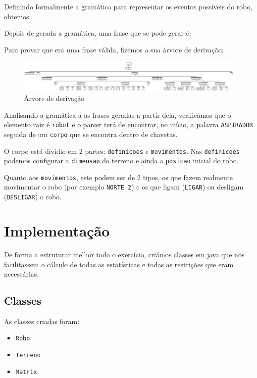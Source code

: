 \documentclass[a4paper]{article}
\begin{document}
Definindo formalmente a gramática para representar os eventos possíveis do robo, obtemos:

 
Depois de gerada a gramática, uma frase que se pode gerar é:

Para provar que era uma frase válida, fizemos a sua árvore de derivação:
\begin{figure}[H]
\centering
\includegraphics[scale=0.29]{arv1.jpeg}
\caption{Árvore de derivação}
\end{figure}
 
 
Analisando a gramática a as frases geradas a partir dela, verificámos que o elemento raiz é \verb|robot| e o parser terá de encontrar, no início, a palavra \verb|ASPIRADOR| seguida de um \verb|corpo| que se encontra dentro de chavetas.
 
O corpo está dividio em 2 partes: \verb|definicoes| e \verb|movimentos|. Nas \verb|definicoes| podemos configurar a \verb|dimensao| do terreno e ainda a \verb|posicao| inicial do robo.
 
Quanto aos \verb|movimentos|, este podem ser de 2 tipos, os que fazem realmente movimentar o robo (por exemplo \verb|NORTE 2|) e os que ligam (\verb|LIGAR|) ou desligam (\verb|DESLIGAR|) o robo.
 
\section{Implementação}
De forma a estruturar melhor todo o exercício, criámos classes em java que nos facilitassem o cálculo de todas as estatísticas e todas as restrições que eram necessárias.
 
\subsection{Classes}
As classes criadas foram:
\begin{itemize}
\item \verb|Robo|
\item \verb|Terreno|
\item \verb|Matrix|
\end{itemize}
 
\end{document}
